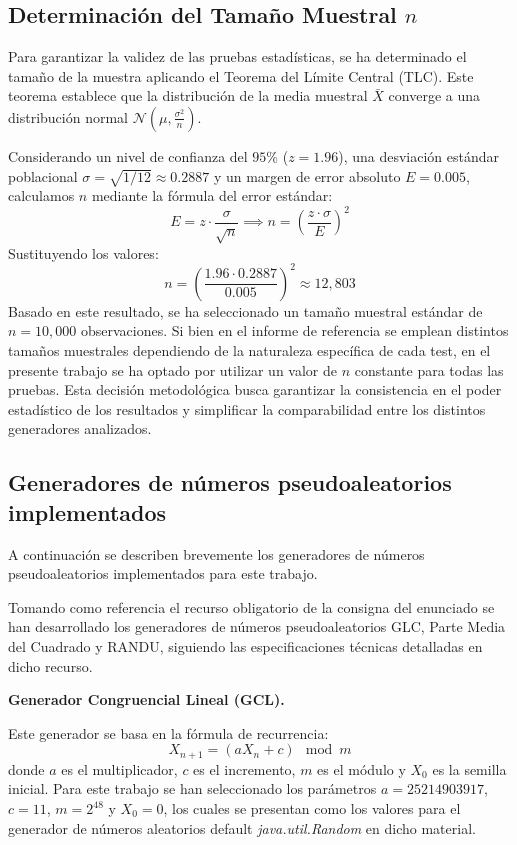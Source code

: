 \documentclass{article}
\begin{document}
\subsection{Determinación del Tamaño Muestral \texorpdfstring{$n$}{n}}
Para garantizar la validez de las pruebas estadísticas, se ha determinado el tamaño de la muestra aplicando el Teorema del Límite Central (TLC). Este teorema establece que la distribución de la media muestral $\bar{X}$ converge a una distribución normal $\mathcal{N}(\mu, \frac{\sigma^2}{n})$.

Considerando un nivel de confianza del $95\%$ ($z = 1.96$), una desviación estándar poblacional $\sigma = \sqrt{1/12} \approx 0.2887$ y un margen de error absoluto $E = 0.005$, calculamos $n$ mediante la fórmula del error estándar:
\[ E = z \cdot \frac{\sigma}{\sqrt{n}} \implies n = \left( \frac{z \cdot \sigma}{E} \right)^2 \]
Sustituyendo los valores:
\[ n = \left( \frac{1.96 \cdot 0.2887}{0.005} \right)^2 \approx 12,803 \]
Basado en este resultado, se ha seleccionado un tamaño muestral estándar de $n = 10,000$ observaciones. Si bien en el informe de referencia \cite{kenny2005} se emplean distintos tamaños muestrales dependiendo de la naturaleza específica de cada test, en el presente trabajo se ha optado por utilizar un valor de $n$ constante para todas las pruebas. Esta decisión metodológica busca garantizar la consistencia en el poder estadístico de los resultados y simplificar la comparabilidad entre los distintos generadores analizados.



\subsection{Generadores de números pseudoaleatorios implementados}

A continuación se describen brevemente los generadores de números pseudoaleatorios implementados para este trabajo.

Tomando como referencia el recurso obligatorio\cite{estadistica_computacional} de la consigna del enunciado se han desarrollado los generadores de números pseudoaleatorios GLC, Parte Media del Cuadrado y RANDU, siguiendo las especificaciones técnicas detalladas en dicho recurso.

\textbf{Generador Congruencial Lineal (GCL).}

Este generador se basa en la fórmula de recurrencia:
$$X_{n+1} = (aX_n + c) \mod m$$
donde $a$ es el multiplicador, $c$ es el incremento, $m$ es el módulo y $X_0$ es la semilla inicial. Para este trabajo se han seleccionado los parámetros $a = 25214903917$, $c = 11$, $m = 2^{48}$ y $X_0 = 0$, los cuales se presentan como los valores para el generador de números aleatorios default \textit{java.util.Random} en dicho material.
\end{document}
